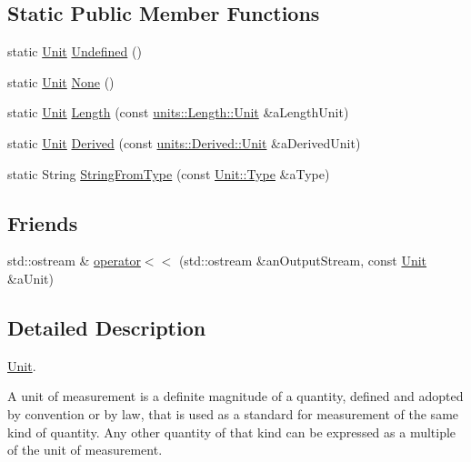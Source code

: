 \subsection*{Static Public Member Functions}
\begin{DoxyCompactItemize}
\item 
static \hyperlink{classostk_1_1physics_1_1_unit}{Unit} \hyperlink{classostk_1_1physics_1_1_unit_a61c8e231a744ece53683ae79deee0850}{Undefined} ()
\item 
static \hyperlink{classostk_1_1physics_1_1_unit}{Unit} \hyperlink{classostk_1_1physics_1_1_unit_a72a993421e48c8b2d4d4fd89ce0142da}{None} ()
\item 
static \hyperlink{classostk_1_1physics_1_1_unit}{Unit} \hyperlink{classostk_1_1physics_1_1_unit_abbf99c91d09a31011c18b359c49d31ed}{Length} (const \hyperlink{classostk_1_1physics_1_1units_1_1_length_a2664470a7eedf5d45c88861fe69badea}{units\+::\+Length\+::\+Unit} \&a\+Length\+Unit)
\item 
static \hyperlink{classostk_1_1physics_1_1_unit}{Unit} \hyperlink{classostk_1_1physics_1_1_unit_af41e733d436f73949ab2fd9766071bdd}{Derived} (const \hyperlink{classostk_1_1physics_1_1units_1_1_derived_1_1_unit}{units\+::\+Derived\+::\+Unit} \&a\+Derived\+Unit)
\item 
static String \hyperlink{classostk_1_1physics_1_1_unit_a2834e4e5fa10d96212016a3cb8a02f02}{String\+From\+Type} (const \hyperlink{classostk_1_1physics_1_1_unit_a1c07d36cd02be8541eb972367e2b628f}{Unit\+::\+Type} \&a\+Type)
\end{DoxyCompactItemize}
\subsection*{Friends}
\begin{DoxyCompactItemize}
\item 
std\+::ostream \& \hyperlink{classostk_1_1physics_1_1_unit_a70630a82d569152709a999efabdb3e4f}{operator$<$$<$} (std\+::ostream \&an\+Output\+Stream, const \hyperlink{classostk_1_1physics_1_1_unit}{Unit} \&a\+Unit)
\end{DoxyCompactItemize}


\subsection{Detailed Description}
\hyperlink{classostk_1_1physics_1_1_unit}{Unit}. 

A unit of measurement is a definite magnitude of a quantity, defined and adopted by convention or by law, that is used as a standard for measurement of the same kind of quantity. Any other quantity of that kind can be expressed as a multiple of the unit of measurement.

